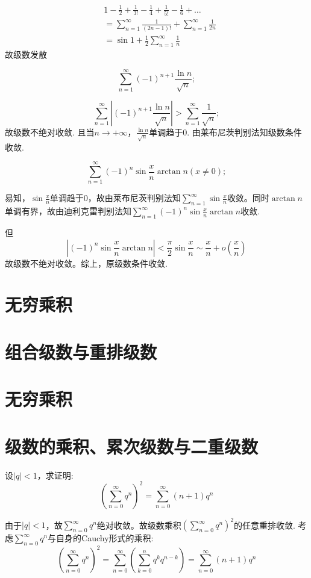 \begin{align*}
    & 1 - \frac{1}{2} + \frac{1}{3!} - \frac{1}{4} + \frac{1}{5!} -
    \frac{1}{6} + \dots
    \\
    & = \sum_{n=1}^{\infty} \frac{1}{(2n-1)!} + \sum_{n=1}^{\infty}
    \frac{1}{2n}
    \\ &= \sin 1 + \frac{1}{2} \sum_{n=1}^{\infty} \frac{1}{n}
\end{align*}
故级数发散

\[
    \sum_{n=1}^{\infty} (-1)^{n+1} \frac{\ln n}{\sqrt{n}};
\]

\[
    \sum_{n=1}^{\infty} \left| (-1)^{n+1} \frac{\ln
    n}{\sqrt{n}} \right|
    > \sum_{n=1}^{\infty} \frac{1}{\sqrt{n}} ;
\]
故级数不绝对收敛.
且当\(n \to + \infty\)，\(\frac{\ln n}{\sqrt{n}}\)单调趋于0.
由莱布尼茨判别法知级数条件收敛.

\[
    \sum_{n=1}^{\infty} (-1)^n \sin \frac{x}{n} \arctan n (x \neq 0);
\]

易知，\(\sin \frac{x}{n}\)单调趋于0，故由莱布尼茨判别法知\(\sum_{n=1}^{\infty} \sin
\frac{x}{n}\)收敛。同时\(\arctan n\)单调有界，故由迪利克雷判别法知\(\sum_{n=1}^{\infty}
(-1)^{n} \sin \frac{x}{n} \arctan n\)收敛.

但\[
    \left| (-1)^{n}\sin \frac{x}{n} \arctan n \right| < \frac{\pi}{2}
    \sin \frac{x}{n} \sim \frac{x}{n} + o(\frac{x}{n})
\]
故级数不绝对收敛。综上，原级数条件收敛.

\section{无穷乘积}
\section{组合级数与重排级数}
\section{无穷乘积}
\section{级数的乘积、累次级数与二重级数}
\begin{problem}
    设\(\left\vert q \right\vert < 1\)，求证明:
    \[
        \left( \sum_{n=0}^{\infty} q^{n} \right)^2
        =\sum_{n=0}^{\infty} (n + 1) q^{n}
    \]
\end{problem}
\begin{solution}
    由于\(\left\vert q \right\vert < 1\)，故\(\sum_{n=0}^{\infty}
    q^{n}\)绝对收敛。故级数乘积\(\left( \sum_{n=0}^{\infty} q^{n}
    \right)^2\)的任意重排收敛.
    考虑\(\sum_{n=0}^{\infty} q^{n}\)与自身的Cauchy形式的乘积:
    \[
        \left( \sum_{n=0}^{\infty} q^{n} \right)^2
        =\sum_{n=0}^{\infty} \left( \sum_{k=0}^{n} q^{k}
        q^{n-k} \right)
        =\sum_{n=0}^{\infty} (n + 1) q^{n}
    \]
\end{solution}

